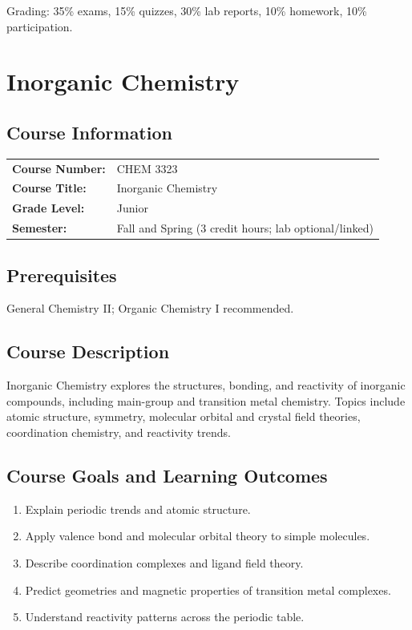 \documentclass[12pt,oneside]{book}
\begin{document}
Grading: 35\% exams, 15\% quizzes, 30\% lab reports, 10\% homework, 10\% participation.


\chapter{Inorganic Chemistry}

\section{Course Information}

\begin{tabular}{ll}
\textbf{Course Number:} & CHEM 3323 \\
\textbf{Course Title:} & Inorganic Chemistry \\
\textbf{Grade Level:} & Junior \\
\textbf{Semester:} & Fall and Spring (3 credit hours; lab optional/linked) \\
\end{tabular}

\section{Prerequisites}

General Chemistry II; Organic Chemistry I recommended.

\section{Course Description}

Inorganic Chemistry explores the structures, bonding, and reactivity of inorganic compounds, including main-group and transition metal chemistry. Topics include atomic structure, symmetry, molecular orbital and crystal field theories, coordination chemistry, and reactivity trends.

\section{Course Goals and Learning Outcomes}

\begin{enumerate}
    \item Explain periodic trends and atomic structure.
    \item Apply valence bond and molecular orbital theory to simple molecules.
    \item Describe coordination complexes and ligand field theory.
    \item Predict geometries and magnetic properties of transition metal complexes.
    \item Understand reactivity patterns across the periodic table.
\end{enumerate}
\end{document}
